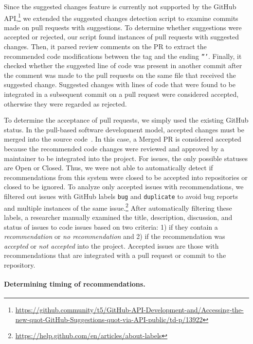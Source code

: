 Since the suggested changes feature is currently not supported by the GitHub API,\footnote{\url{https://github.community/t5/GitHub-API-Development-and/Accessing-the-new-quot-GitHub-Suggestions-quot-via-API-public/td-p/13922}} we extended the suggested changes detection script to examine commits made on pull requests with suggestions. To determine whether suggestions were accepted or rejected, our script found instances of pull requests with suggested changes. Then, it parsed review comments on the PR to extract the recommended code modifications between the \sugg tag and the ending \texttt{'''}. Finally, it checked whether the suggested line of code was present in another commit after the comment was made to the pull requests on the same file that received the suggested change. Suggested changes with lines of code that were found to be integrated in a subsequent commit on a pull request were considered accepted, otherwise they were regarded as rejected.

To determine the acceptance of pull requests, we simply used the existing GitHub status. In the pull-based software development model, accepted changes must be merged into the source code~\cite{gousios2014pullrequests}. In this case, a Merged PR is considered accepted because the recommended code changes were reviewed and approved by a maintainer to be integrated into the project. For issues, the only possible statuses are Open or Closed. Thus, we were not able to automatically detect if recommendations from this system were closed to be accepted into repositories or closed to be ignored. To analyze only accepted issues with recommendations, we filtered out issues with GitHub labels \texttt{bug} and \texttt{duplicate} to avoid bug reports and multiple instances of the same issue.\footnote{\url{https://help.github.com/en/articles/about-labels}} After automatically filtering these labels, a researcher manually examined the title, description, discussion, and status of issues to code issues based on two criteria: 1) if they contain a \textit{recommendation} or \textit{no recommendation} and 2) if the recommendation was \textit{accepted} or \textit{not accepted} into the project. Accepted issues are those with recommendations that are integrated with a pull request or commit to the repository.

\paragraph{Determining timing of recommendations.}

